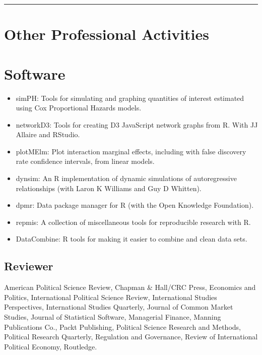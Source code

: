 \documentclass[a4paper]{article}
\begin{document}
{%
\vspace{0.25cm}
\medskip\hrule height 1pt
\vspace{0.5cm}

\section*{Other Professional Activities}

\section*{Software}

\begin{itemize}
    \item simPH: Tools for simulating and graphing quantities of interest estimated using Cox Proportional Hazards models.
    \item networkD3: Tools for creating D3 JavaScript network graphs from R. With JJ Allaire and RStudio.
    \item plotMElm: Plot interaction marginal effects, including with false discovery rate confidence intervals, from linear models.
    \item dynsim: An R implementation of dynamic simulations of autoregressive relationships (with Laron K Williams and Guy D Whitten).
    \item dpmr: Data package manager for R (with the Open Knowledge Foundation).
    \item repmis: A collection of miscellaneous tools for reproducible research with R.
    \item DataCombine: R tools for making it easier to combine and clean data sets.
\end{itemize}

\subsection*{Reviewer}

American Political Science Review, Chapman \& Hall/CRC Press, Economics and Politics,
International Political Science Review, International Studies Perspectives, International Studies Quarterly,
Journal of Common Market Studies, Journal of Statistical Software,
Managerial Finance, Manning Publications Co.,
Packt Publishing, Political Science Research and Methods, Political Research
Quarterly, Regulation and Governance, Review of International Political Economy,
Routledge.

}
\end{document}
